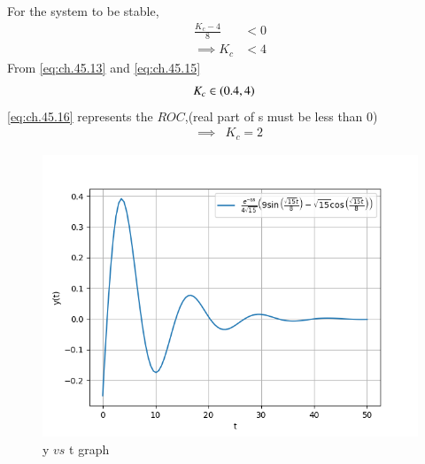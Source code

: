 \documentclass[journal,12pt,twocolumn]{IEEEtran}
\theoremstyle{remark}
\begin{document}
For the system to be stable,
\begin{align}
    \frac{K_c-4}{8}&<0   \\
    \implies K_c&<4 \label{eq:ch.45.15}
\end{align}
From \eqref{eq:ch.45.13} and \eqref{eq:ch.45.15}
\begin{align}
    &K_c \in \left(0.4,4\right)    \label{eq:ch.45.16}
\end{align}
\eqref{eq:ch.45.16} represents the $ROC$,(real part of s must be less than 0)
\begin{align}
    \implies &K_c=2
\end{align}
\begin{figure}[htbp]
    \centering
    \includegraphics[width=\columnwidth]{figs/b.png}
    \caption{y $vs$ t graph}
    \label{fig:ch.45.2}
\end{figure}     
\end{document}
